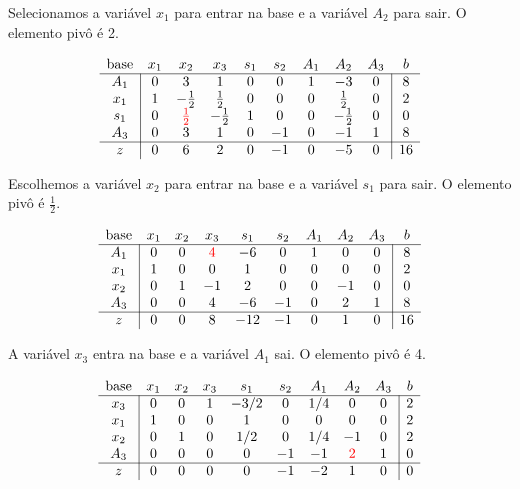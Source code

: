 \documentclass{article}
\begin{document}
Selecionamos a variável $x_1$ para entrar na base e a variável $A_2$ para sair. O elemento pivô é 2.

\[
  \begin{array}{c|cccccccc|c}
    \text{base} & x_1 & x_2 & x_3 & s_1 & s_2 & A_1 & A_2 & A_3 &  b \\ \hline
            A_1 &   0 &   3 &   1 &   0 &   0 &   1 &  -3 &   0 &  8 \\
            x_1 &   1 &-\frac{1}{2} & \frac{1}{2} &   0 &   0 &   0 & \frac{1}{2} &   0 &  2 \\
            s_1 &   0 & \color{red} \frac{1}{2} \color{black} &-\frac{1}{2} &   1 &   0 &   0 &-\frac{1}{2} &   0 &  0 \\
            A_3 &   0 &   3 &   1 &   0 &  -1 &   0 &  -1 &   1 &  8 \\ \hline
              z &   0 &   6 &   2 &   0 &  -1 &   0 &  -5 &   0 & 16
  \end{array}
\]

Escolhemos a variável $x_2$ para entrar na base e a variável $s_1$ para sair. O elemento pivô é $\frac{1}{2}$.

\[
  \begin{array}{c|cccccccc|c}
    \text{base} & x_1 & x_2 & x_3 & s_1 & s_2 & A_1 & A_2 & A_3 &  b \\ \hline
            A_1 &   0 &   0 & \color{red}4\color{black} &  -6 &   0 &   1 &   0 &   0 &  8 \\
            x_1 &   1 &   0 &   0 &   1 &   0 &   0 &   0 &   0 &  2 \\
            x_2 &   0 &   1 &  -1 &   2 &   0 &   0 &  -1 &   0 &  0 \\
            A_3 &   0 &   0 &   4 &  -6 &  -1 &   0 &   2 &   1 &  8 \\ \hline
              z &   0 &   0 &   8 & -12 &  -1 &   0 &   1 &   0 & 16
  \end{array}
\]

A variável $x_3$ entra na base e a variável $A_1$ sai. O elemento pivô é 4.

\[
  \begin{array}{c|cccccccc|c}
    \text{base} & x_1 & x_2 & x_3 & s_1 & s_2 & A_1 & A_2 & A_3 &  b \\ \hline
            x_3 &   0 &   0 &   1 &-3/2 &   0 & 1/4 &   0 &   0 &  2 \\
            x_1 &   1 &   0 &   0 &   1 &   0 &   0 &   0 &   0 &  2 \\
            x_2 &   0 &   1 &   0 & 1/2 &   0 & 1/4 &  -1 &   0 &  2 \\
            A_3 &   0 &   0 &   0 &   0 &  -1 &  -1 &   \color{red}2\color{black} &   1 &  0 \\ \hline
              z &   0 &   0 &   0 &   0 &  -1 &  -2 &   1 &   0 &  0
  \end{array}
\]
\end{document}
